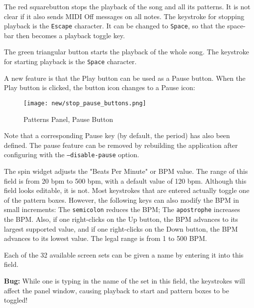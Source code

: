    \setcounter{ItemCounter}{0}      %

   The red squarebutton stops the playback of the song and all its patterns.
   It is not clear if it also sends MIDI Off messages on all notes.
   The keystroke for stopping playback is the \texttt{Escape} character.
   It can be changed to \texttt{Space}, so that the space-bar then becomes a
   playback toggle key.

   The green triangular button starts the playback of the whole song.
   The keystroke for starting playback is the \texttt{Space} character.

   A new feature is that the Play button can be used as a Pause button.
   When the Play button is clicked, the button icon changes to a Pause icon:

\begin{figure}[H]
   \centering 
   \texttt{[image: new/stop\_pause\_buttons.png]}
   \caption{Patterns Panel, Pause Button}
   \label{fig:pattern_window_pause_button}
\end{figure}

   Note that a corresponding Pause key (by default, the period) has also been
   defined.  The pause feature can be removed by rebuilding the application
   after configuring with the \texttt{--disable-pause} option.

   The spin widget adjusts the "Beats Per Minute" or BPM value.  The
   range of this field is from 20 bpm to 500 bpm, with a default value of
   120 bpm.
   Although this field looks editable, it is not.  Most keystrokes
   that are entered actually toggle one of the pattern boxes.
   However, the following keys can also modify the BPM in small increments:
    The \texttt{semicolon} reduces the BPM;
    The \texttt{apostrophe} increases the BPM.
   Also, if one right-clicks on the Up button, the BPM advances to its largest
   supported value, and if one right-clicks on the Down button, the BPM
   advances to its lowest value.  The legal range is from 1 to 500 BPM.

   Each of the 32 available screen sets can be given a name by entering it
   into this field.

   \textbf{Bug:}
   While one is typing in the name of the set in this field, the keystrokes
   will affect the panel window, causing playback to start and pattern
   boxes to be toggled!

